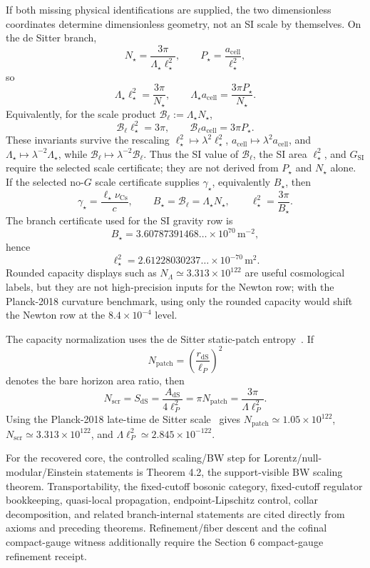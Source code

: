 If both missing physical identifications are supplied, the two dimensionless coordinates determine
dimensionless geometry, not an SI scale by themselves. On
the de Sitter branch,
\[
N_\star=\frac{3\pi}{\Lambda_\star\ell_\star^2},
\qquad
P_\star=\frac{a_{\mathrm{cell}}}{\ell_\star^2},
\]
so
\[
\Lambda_\star\ell_\star^2=\frac{3\pi}{N_\star},
\qquad
\Lambda_\star a_{\mathrm{cell}}=\frac{3\pi P_\star}{N_\star}.
\]
Equivalently, for the scale product
\(\mathcal B_\ell:=\Lambda_\star N_\star\),
\[
\mathcal B_\ell\ell_\star^2=3\pi,
\qquad
\mathcal B_\ell a_{\mathrm{cell}}=3\pi P_\star.
\]
These invariants survive the rescaling
\(\ell_\star^2\mapsto\lambda^2\ell_\star^2\),
\(a_{\mathrm{cell}}\mapsto\lambda^2a_{\mathrm{cell}}\), and
\(\Lambda_\star\mapsto\lambda^{-2}\Lambda_\star\), while
\(\mathcal B_\ell\mapsto\lambda^{-2}\mathcal B_\ell\). Thus the SI value of
\(\mathcal B_\ell\), the SI area \(\ell_\star^2\), and \(G_{\mathrm{SI}}\) require the selected
scale certificate; they are not derived from \(P_\star\) and \(N_\star\) alone.
If the selected no-\(G\) scale certificate supplies \(\gamma_\star\), equivalently \(B_\star\),
then
\[
\gamma_\star=\frac{\ell_\star\nu_{\mathrm{Cs}}}{c},
\qquad
B_\star=\mathcal B_\ell=\Lambda_\star N_\star,
\qquad
\ell_\star^2=\frac{3\pi}{B_\star}.
\]
The branch certificate used for the SI gravity row is
\[
B_\star=
3.60787391468\ldots
\times10^{70}\,\mathrm{m^{-2}},
\]
hence
\[
\ell_\star^2=
2.61228030237\ldots
\times10^{-70}\,\mathrm{m^2}.
\]
Rounded capacity displays such as \(N_\Lambda\simeq3.313\times10^{122}\) are useful cosmological
labels, but they are not high-precision inputs for the Newton row; with the Planck-2018 curvature
benchmark, using only the rounded capacity would shift the Newton row at the \(8.4\times10^{-4}\)
level.

The capacity normalization uses the de Sitter static-patch entropy~\cite{gibbonsHawking77}. If
\[
N_{\mathrm{patch}}=\left(\frac{r_{\mathrm{dS}}}{\ell_P}\right)^2
\]
denotes the bare horizon area ratio, then
\[
N_{\mathrm{scr}}=S_{\mathrm{dS}}=\frac{A_{\mathrm{dS}}}{4\ell_P^2}
=\pi N_{\mathrm{patch}}
=\frac{3\pi}{\Lambda\ell_P^2}.
\]
Using the Planck-2018 late-time de Sitter scale~\cite{planck18} gives
\(N_{\mathrm{patch}}\simeq1.05\times10^{122}\),
\(N_{\mathrm{scr}}\simeq3.313\times10^{122}\), and
\(\Lambda\ell_P^2\simeq2.845\times10^{-122}\).

For the recovered core, the controlled scaling/BW step for Lorentz/null-modular/Einstein statements is Theorem 4.2, the support-visible BW scaling theorem. Transportability, the fixed-cutoff bosonic category, fixed-cutoff regulator bookkeeping, quasi-local propagation, endpoint-Lipschitz control, collar decomposition, and related branch-internal statements are cited directly from axioms and preceding theorems. Refinement/fiber descent and the cofinal compact-gauge witness additionally require the Section 6 compact-gauge refinement receipt.

